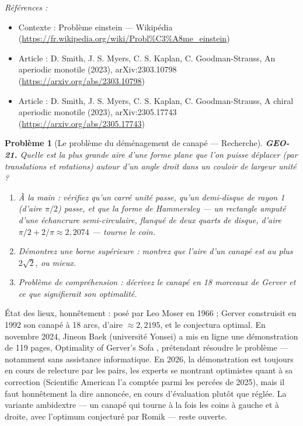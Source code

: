 \documentclass[11pt]{article}
\newtheorem{problem}{Problème}
\newenvironment{refs}{\par\small\noindent\emph{Références :}\begin{itemize}\setlength\itemsep{0pt}}{\end{itemize}\normalsize}
\begin{document}
\begin{refs}
\item Contexte : Problème einstein --- Wikipédia (\url{https://fr.wikipedia.org/wiki/Probl%C3%A8me_einstein})
\item Article : D. Smith, J. S. Myers, C. S. Kaplan, C. Goodman-Strauss, \og{} An aperiodic monotile \fg{} (2023), arXiv:2303.10798 (\url{https://arxiv.org/abs/2303.10798})
\item Article : D. Smith, J. S. Myers, C. S. Kaplan, C. Goodman-Strauss, \og{} A chiral aperiodic monotile \fg{} (2023), arXiv:2305.17743 (\url{https://arxiv.org/abs/2305.17743})
\end{refs}

\bigskip

\begin{problem}[{Le problème du déménagement de canapé --- Recherche}]
\textbf{GEO-21.} Quelle est la plus grande aire d'une forme plane que l'on puisse déplacer (par
translations et rotations) autour d'un angle droit dans un couloir de largeur unité ?
\begin{enumerate}
\item[(a)] À la main : vérifiez qu'un carré unité passe, qu'un demi-disque de rayon 1 (d'aire
$ \pi/2 $) passe, et que la forme de Hammersley --- un rectangle amputé d'une échancrure
semi-circulaire, flanqué de deux quarts de disque, d'aire $ \pi/2 + 2/\pi \approx 2{,}2074 $ ---
tourne le coin.
\item[(b)] Démontrez une borne supérieure : montrez que l'aire d'un canapé est au plus
$ 2\sqrt{2} $, ou mieux.
\item[(c)] Problème de compréhension : décrivez le canapé en 18 morceaux de Gerver et ce que
signifierait son optimalité.
\end{enumerate}

\end{problem}

\noindent État des lieux, honnêtement : posé par Leo Moser en 1966 ; Gerver construisit en
1992 son canapé à 18 arcs, d'aire $ \approx 2{,}2195 $, et le conjectura optimal. En novembre
2024, Jineon Baek (université Yonsei) a mis en ligne une démonstration de 119 pages, \og{} Optimality of
Gerver's Sofa \fg{}, prétendant résoudre le problème --- notamment sans assistance informatique. En 2026,
la démonstration est toujours en cours de relecture par les pairs, les experts se montrant
optimistes quant à sa correction (Scientific American l'a comptée parmi les percées de 2025),
mais il faut honnêtement la dire \og{} annoncée, en cours d'évaluation \fg{} plutôt que réglée. La variante
ambidextre --- un canapé qui tourne à la fois les coins à gauche et à droite, avec l'optimum conjecturé
par Romik --- reste ouverte.
\end{document}
